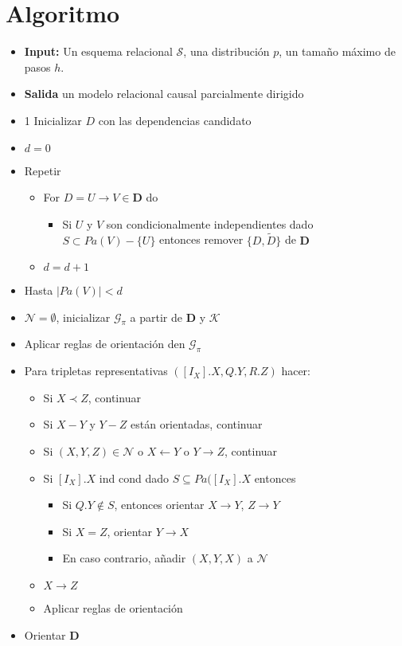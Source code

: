 \documentclass[11pt]{article}
\theoremstyle{plain}
\begin{document}
\section{Algoritmo}
\begin{itemize}
\item \textbf{Input:} Un esquema relacional $\mathcal{S}$, una distribución $p$, un tamaño máximo de pasos $h$.
\item \textbf{Salida} un modelo relacional causal parcialmente dirigido
\item 1 Inicializar $D$ con las dependencias candidato
\item $d=0$
\item Repetir
	\begin{itemize}
		\item For $D = U \to V \in \mathbf{D}$ do
			\begin{itemize}
				\item Si $U$ y $V$ son condicionalmente independientes dado $S \subset Pa(V)-\{U\}$ entonces remover $\{D,\tilde{D} \}$ de $\mathbf{D}$
			\end{itemize}
		\item $d=d+1$
	\end{itemize}
\item Hasta $| Pa(V) | < d$
\item $\mathcal{N}=\emptyset$, inicializar $\mathcal{G}_\pi$ a partir de $\mathbf{D}$ y $\mathcal{K}$
\item Aplicar reglas de orientación den $\mathcal{G}_\pi$
\item Para  tripletas representativas $([I_X].X,Q.Y,R.Z)$ hacer:
	\begin{itemize}
		\item Si $X \prec Z$, continuar
		\item Si $X - Y$ y $Y - Z$ están orientadas, continuar
		\item Si $(X,Y,Z) \in \mathcal{N}$ o $X \leftarrow Y$ o $Y \to Z$, continuar
		\item Si $[I_X].X$ ind cond dado $S \subseteq Pa([I_X].X$ entonces
			\begin{itemize}
				\item Si $Q.Y \notin S$, entonces orientar $X \to Y$, $Z \to Y$
				\item Si $X=Z$, orientar $Y \to X$
				\item En caso contrario, añadir $(X,Y,X)$ a $\mathcal{N}$
			\end{itemize}
		\item $X \to Z$
		\item Aplicar reglas de orientación
	\end{itemize}
\item Orientar $\mathbf{D}$
\end{itemize}


\end{document}
